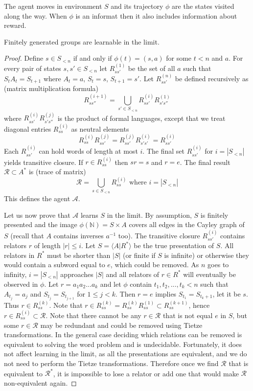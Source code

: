 \documentclass[oneside,english,logo]{amuthesis}
\begin{document}
The agent moves in environment $S$ and its trajectory $\phi$ are the states visited along the way. 
When $\phi$ is an informat then it also includes information about reward. 
\begin{theorem}
Finitely generated groups are learnable in the limit. \label{theorem:finitely_presented_groups_are_learnable}
\end{theorem}
\begin{proof}
Define $s\in S_{<n}$ if and only if $\phi(t)=(s,a)$ for some $t< n$ and $a$. For every pair of states $s,s' \in S_{<n}$ let $R_{ss'}^{(1)}$ be the set of all $a$ such that $S_tA_t=S_{t+1}$ where $A_t=a$, $S_t=s$, $S_{t+1}=s'$. Let $R_{ss'}^{(n)}$ be defined recursively as (matrix multiplication formula)
\[
R_{ss''}^{(i+1)} = \bigcup\limits_{s'\in S_{<n}} R_{ss'}^{(i)}R_{s's''}^{(1)}
\]
where $R_{ss'}^{(i)}R_{s's''}^{(j)}$ is the product of formal languages, except that we treat diagonal entries $R_{ss}^{(i)}$ as neutral elements
\[
R_{ss}^{(i)}R_{ss'}^{(j)}=R_{ss'}^{(j)}R_{s's'}^{(i)}=R_{ss'}^{(i)}
\]
Each $R_{ss'}^{(i)}$ can hold words of length at most $i$.
The final set $R_{ss'}^{(i)}$ for $i=|S_{<n}|$ yields transitive closure. If $r\in R_{ss}^{(i)}$ then $sr=s$ and $r=e$. The final result $\mathcal{R}\subset A^*$ is (trace of matrix)
\[
\mathcal{R} = \bigcup\limits_{s\in S_{<n}} R_{ss}^{(i)}\text{ where }i=|S_{<n}|
\]
This defines the agent $\mathcal{A}$.	


Let us now prove that $\mathcal{A}$ learns $S$ in the limit. By assumption, $S$ is finitely presented and the image $\phi(\mathbb{N})=S \times A$ covers all edges in the Cayley graph of $S$ (recall that $A$ contains inverses $a^{-1}$ too). The transitive closure $R_{ss'}^{(i)}$ contains relators $r$ of length $|r| \le i$. Let $S=\langle A | R^* \rangle$ be the true presentation of $S$. All relators in $R^*$ must be shorter than $|S|$ (or finite if $S$ is infinite) or otherwise they would contain a subword equal to $e$, which could be removed. As $n$ goes to infinity, $i=|S_{<n}|$ approaches $|S|$ and all relators of $r\in R^*$ will eventually be observed in $\phi$. Let $r=a_1a_2...a_k$ and let $\phi$ contain $t_1,t_2,...,t_k<n$ such that $A_{t_j}=a_j$ and $S_{t_j}=S_{t_{j+1}}$ for $1\le j < k$. Then $r=e$ implies $S_{t_1}=S_{t_{k}+1}$, let it be $s$. Thus $r\in R^{(k)}_{ss}$. Note that $r\in R^{(k)}_{ss}=R^{(k)}_{ss}R^{(1)}_{ss} \subset R^{(k+1)}_{ss}$, hence $r\in R^{(i)}_{ss} \subset \mathcal{R}$. Note that there cannot be any $r\in \mathcal{R}$ that is not equal $e$ in $S$, but some $r\in \mathcal{R}$ may be redundant and could be removed using Tietze transformations. In the general case deciding which relations can be removed is equivalent to solving the word problem and is undecidable. Fortunately, it does not affect learning in the limit, as all the presentations are equivalent, and we do not need to perform the Tietze transformations. Therefore once we find $ \mathcal{R}$ that is equivalent to $ \mathcal{R}^{*}$, it is impossible to lose a relator or add one that would make $\mathcal{R}$ non-equivalent again.
\end{proof}
\end{document}
